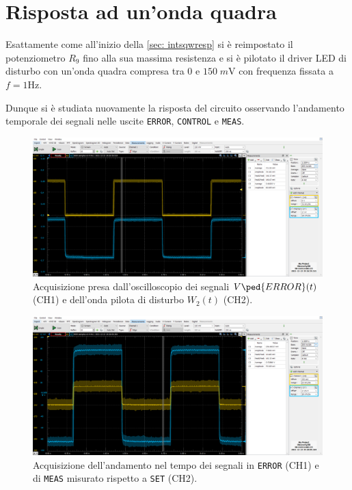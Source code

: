 \documentclass[10pt, a4paper, italian]{article}
\begin{document}
\section{Risposta ad un'onda quadra}
Esattamente come all'inizio della \cref{sec: intsqwresp} si è reimpostato
il potenziometro $R_9$ fino alla sua massima resistenza e si è pilotato il
driver LED di disturbo con un'onda quadra compresa tra $0$ e
$150 \; \si{m\V}$ con frequenza fissata a $f = 1 \si{\Hz}$.

Dunque si è studiata nuovamente la risposta del circuito osservando
l'andamento temporale dei segnali nelle uscite \verb+ERROR+, \verb+CONTROL+ e
\verb+MEAS+.
\begin{figure}[htbp]
    \centering
	\includegraphics[width=\textwidth]{proportional}
    \caption{Acquisizione presa dall'oscilloscopio dei segnali
    $V\ped{ERROR}(t)$ (CH1) e dell'onda pilota di disturbo $W_2 (t)$ (CH2).
    \label{fig: properrnoise}}
\end{figure}
\begin{figure}[htbp]
    \centering
	\includegraphics[width=\textwidth]{proportional.meas}
    \caption{Acquisizione dell'andamento nel tempo dei segnali in
    \texttt{ERROR} (CH1) e di \texttt{MEAS} misurato rispetto a \texttt{SET}
    (CH2).
    \label{fig: properrmeas}}
\end{figure}
\end{document}
